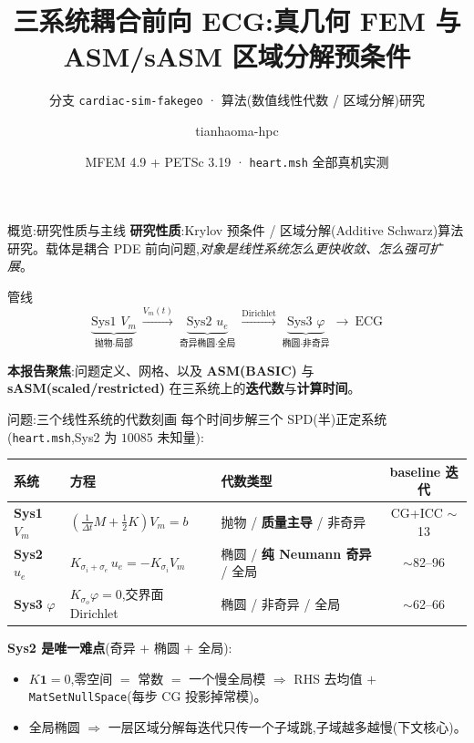 \documentclass[aspectratio=169,11pt,fontset=fandol]{ctexbeamer}
\title[cardiac-sim-fakegeo]{三系统耦合前向 ECG:真几何 FEM 与 ASM/sASM 区域分解预条件}
\subtitle{分支 \texttt{cardiac-sim-fakegeo} · 算法(数值线性代数 / 区域分解)研究}
\author{tianhaoma-hpc}
\date{MFEM 4.9 + PETSc 3.19 · \texttt{heart.msh} 全部真机实测}
\begin{document}
\begin{frame}\titlepage\end{frame}

\begin{frame}{概览:研究性质与主线}
\textbf{研究性质}:Krylov 预条件 / 区域分解(Additive Schwarz)算法研究。载体是耦合 PDE 前向问题,\emph{对象是线性系统怎么更快收敛、怎么强可扩展}。
\vspace{0.6em}
\begin{block}{管线}
\[
\underbrace{\text{Sys1 } V_m}_{\text{抛物·局部}}\ \xrightarrow{V_m(t)}\
\underbrace{\text{Sys2 } u_e}_{\text{奇异椭圆·全局}}\ \xrightarrow{\text{Dirichlet}}\
\underbrace{\text{Sys3 } \varphi}_{\text{椭圆·非奇异}}\ \to\ \text{ECG}
\]
\end{block}
\textbf{本报告聚焦}:问题定义、网格、以及 \textbf{ASM(BASIC)} 与 \textbf{sASM(scaled/restricted)} 在三系统上的\textbf{迭代数}与\textbf{计算时间}。
\end{frame}

\begin{frame}{问题:三个线性系统的代数刻画}
每个时间步解三个 SPD(半)正定系统(\texttt{heart.msh},Sys2 为 $10085$ 未知量):
\vspace{0.4em}
\begin{table}\small
\begin{tabular}{@{}lllc@{}}
\toprule
系统 & 方程 & 代数类型 & baseline 迭代 \\
\midrule
\textbf{Sys1} $V_m$ & $\left(\tfrac1{\Delta t}M+\tfrac12K\right)V_m=b$ & 抛物 / \textbf{质量主导} / 非奇异 & CG+ICC $\sim$13 \\
\textbf{Sys2} $u_e$ & $K_{\sigma_i+\sigma_e}\,u_e=-K_{\sigma_i}V_m$ & 椭圆 / \textbf{纯 Neumann 奇异} / 全局 & $\sim$82--96 \\
\textbf{Sys3} $\varphi$ & $K_{\sigma_o}\varphi=0$,交界面 Dirichlet & 椭圆 / 非奇异 / 全局 & $\sim$62--66 \\
\bottomrule
\end{tabular}
\end{table}
\vspace{0.3em}
\textbf{Sys2 是唯一难点}(奇异 $+$ 椭圆 $+$ 全局):
\begin{itemize}
\item $K\mathbf{1}=0$,零空间 $=$ 常数 $=$ 一个慢全局模 $\Rightarrow$ RHS 去均值 $+$ \texttt{MatSetNullSpace}(每步 CG 投影掉常模)。
\item 全局椭圆 $\Rightarrow$ 一层区域分解每迭代只传一个子域跳,子域越多越慢(下文核心)。
\end{itemize}
\end{frame}
\end{document}
